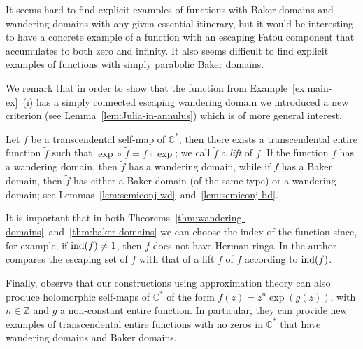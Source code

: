 \documentclass[a4paper, 12pt, reqno]{amsart}
\newcommand{\margin}[1]{\marginnote{\red{#1}}}
\numberwithin{equation}{section}
\newcommand{\red}[1]{{\color{red} #1}}
\theoremstyle{plain}
\theoremstyle{definition}
\theoremstyle{remark}
\newcommand{\C}{{\mathbb{C}}}
\newcommand{\Z}{{\mathbb{Z}}}
\begin{document}
It seems hard to find explicit examples of functions with Baker domains and wandering domains with any given essential itinerary, but it would be interesting to have a concrete example of a function with an escaping Fatou component that accumulates to both zero and infinity. It also seems difficult to find explicit examples of functions with simply parabolic Baker domains.

We remark that in order to show that the function from Example~\ref{ex:main-ex}~(i) has a simply connected escaping wandering domain we introduced a new criterion (see Lemma~\ref{lem:Julia-in-annulus}) which is of more general interest. 

Let $f$ be a transcendental self-map of $\C^*$, then there exists a transcendental entire function $\tilde{f}$ such that $\exp \circ \,\tilde{f}=f\circ \exp$; we call $\tilde{f}$ a \textit{lift} of $f$. If the function $f$ has a wandering domain, then $\tilde{f}$ has a wandering domain, while if $f$ has a Baker domain, then $\tilde{f}$ has either a Baker domain (of the same type) or a wandering domain; see Lemmas~\ref{lem:semiconj-wd}~and~\ref{lem:semiconj-bd}. 

It is important that in both Theorems~\ref{thm:wandering-domains}~and~\ref{thm:baker-domains} we can choose the index of the function since, for example, if $\textup{ind}(f)\neq 1$, then $f$ does not have Herman rings. In \cite{martipete4} the author compares the escaping set of $f$ with that of a lift $\tilde{f}$ of $f$ according to $\textup{ind}(f)$.

Finally, observe that our constructions using approximation theory can also produce holomorphic self-maps of $\C^*$ of the form $f(z)=z^n\exp(g(z))$, with $n\in\Z$ and $g$ a non-constant entire function. In particular, they can provide new examples of transcendental entire functions with no zeros in $\C^*$ that have wandering domains and Baker domains.


\end{document}
